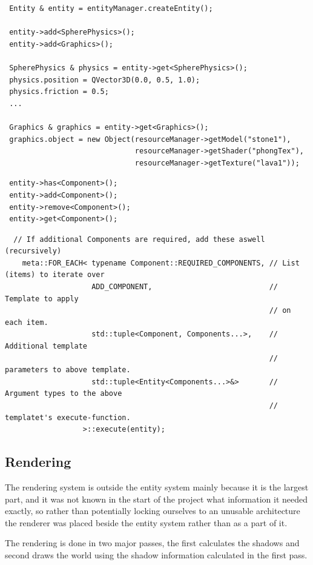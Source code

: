\begin{lstlisting}
 Entity & entity = entityManager.createEntity();
 
 entity->add<SpherePhysics>();
 entity->add<Graphics>();
 
 SpherePhysics & physics = entity->get<SpherePhysics>();
 physics.position = QVector3D(0.0, 0.5, 1.0);
 physics.friction = 0.5;
 ...
 
 Graphics & graphics = entity->get<Graphics>();
 graphics.object = new Object(resourceManager->getModel("stone1"),
                              resourceManager->getShader("phongTex"),
                              resourceManager->getTexture("lava1")); 
\end{lstlisting}

\begin{lstlisting}
 entity->has<Component>();
 entity->add<Component>();
 entity->remove<Component>();
 entity->get<Component>();
\end{lstlisting}

\begin{lstlisting}
  // If additional Components are required, add these aswell (recursively)
    meta::FOR_EACH< typename Component::REQUIRED_COMPONENTS, // List (items) to iterate over
                    ADD_COMPONENT,                           // Template to apply
                                                             // on each item.
                    std::tuple<Component, Components...>,    // Additional template
                                                             // parameters to above template.
                    std::tuple<Entity<Components...>&>       // Argument types to the above
                                                             // templatet's execute-function.
                  >::execute(entity);

\end{lstlisting}

\subsection{Rendering}
The rendering system is outside the entity system mainly because it is the largest part, and it was not known in the start of the project what information it needed exactly, so rather than potentially locking ourselves to an unusable architecture the renderer was placed beside the entity system rather than as a part of it.

The rendering is done in two major passes, the first calculates the shadows and second draws the world using the shadow information calculated in the first pass.

